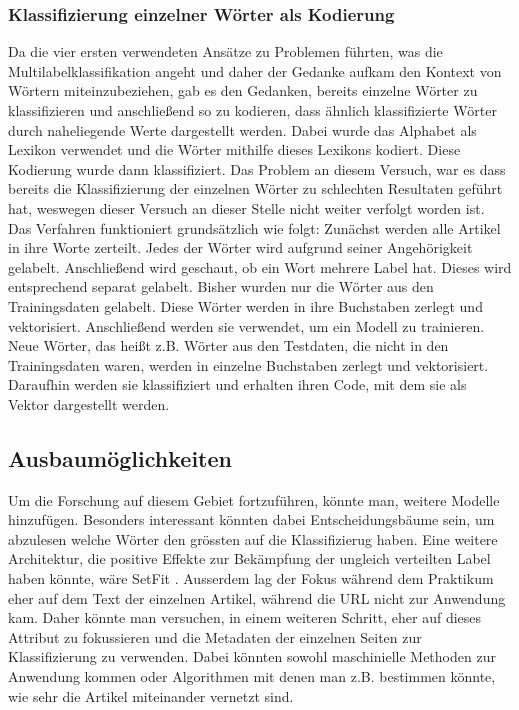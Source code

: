 \subsubsection{Klassifizierung einzelner Wörter als Kodierung}
Da die vier ersten verwendeten Ansätze zu Problemen führten, was die Multilabelklassifikation angeht und daher der Gedanke aufkam den Kontext von Wörtern miteinzubeziehen, gab es den Gedanken, bereits einzelne Wörter zu klassifizieren und anschließend so zu kodieren, dass ähnlich klassifizierte Wörter durch naheliegende Werte dargestellt werden. Dabei wurde das Alphabet als Lexikon verwendet und die Wörter mithilfe dieses Lexikons kodiert. Diese Kodierung wurde dann klassifiziert. Das Problem an diesem Versuch, war es dass bereits die Klassifizierung der einzelnen Wörter zu schlechten Resultaten geführt hat, weswegen dieser Versuch an dieser Stelle nicht weiter verfolgt worden ist. Das Verfahren funktioniert grundsätzlich wie folgt: Zunächst werden alle Artikel in ihre Worte zerteilt. Jedes der Wörter wird aufgrund seiner Angehörigkeit gelabelt. Anschließend wird geschaut, ob ein Wort mehrere Label hat. Dieses wird entsprechend separat gelabelt. Bisher wurden nur die Wörter aus den Trainingsdaten gelabelt. Diese Wörter werden in ihre Buchstaben zerlegt und vektorisiert. Anschließend werden sie verwendet, um ein Modell zu trainieren. Neue Wörter, das heißt z.B. Wörter aus den Testdaten, die nicht in den Trainingsdaten waren, werden in einzelne Buchstaben zerlegt und vektorisiert. Daraufhin werden sie klassifiziert und erhalten ihren Code, mit dem sie als Vektor dargestellt werden.

\subsection{Ausbaumöglichkeiten}
Um die Forschung auf diesem Gebiet fortzuführen, könnte man, weitere Modelle hinzufügen. Besonders interessant könnten dabei Entscheidungsbäume sein, um abzulesen welche Wörter den grössten auf die Klassifizierug haben. Eine weitere Architektur, die positive Effekte zur Bekämpfung der ungleich verteilten Label haben könnte, wäre SetFit \cite{Tunstall2022}. Ausserdem lag der Fokus während dem Praktikum eher auf dem Text der einzelnen Artikel, während die URL nicht zur Anwendung kam. Daher könnte man versuchen, in einem weiteren Schritt, eher auf dieses Attribut zu fokussieren und die Metadaten der einzelnen Seiten zur Klassifizierung zu verwenden. Dabei könnten sowohl maschinielle Methoden zur Anwendung kommen oder Algorithmen mit denen man z.B. bestimmen könnte, wie sehr die Artikel miteinander vernetzt sind.
